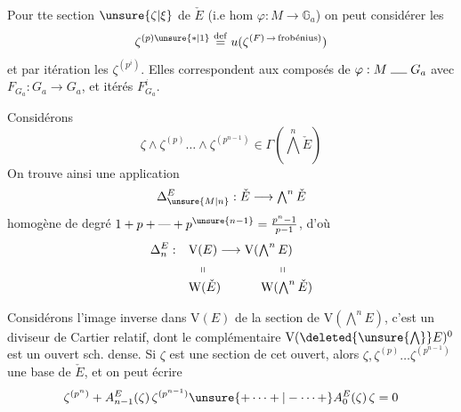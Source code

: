 Pour tte section $\unsure{\zeta|\xi}$ de $\check E$ (i.e hom $\varphi:M\to\mathbb G_a$) on peut considérer les 
\[
 \zeta^{(p)\unsure{*|1}}\overset{\mathrm{def}}{=}
 u(\zeta^{(F)\,\to\,\text{frobénius})})
\]
et par itération les $\zeta^{(p^i)}$. Elles correspondent aux composés de
$\varphi:M\mathrel{\rule{1.3em}{.4pt}}G_a$ avec $F_{G_a}:G_a\to G_a$,
et   itérés $F_{G_a}^{i}$.

Considérons
\[
 \zeta\wedge\zeta^{(p)}\ldots\wedge\zeta^{(p^{n-1})}
 \in\Gamma(\textstyle\bigwedge^n\check E)
\]
On trouve ainsi  une application 
\[
 \Delta^{E}_{\unsure{M|n}}:\check E\longrightarrow\textstyle\bigwedge^n\check E
\]
homogène de degré $1+p+\text{---}+p^{\unsure{n-1}}=\frac{p^n-1}{p-1}$, d'où
\[
 \begin{aligned}
 \Delta_{n}^E:\quad &\mathrm V(E)\longrightarrow \mathrm V(\textstyle\bigwedge^{n}E)\\
 &\hspace{.7em}\shortparallel \hspace{6em}\shortparallel\\[-2pt]
 &\mathrm W(\check E)\hspace{3.2em}\mathrm W(\textstyle\bigwedge^{n}\check E)
 \end{aligned}
\]

Considérons l'image inverse dans $\mathrm V(E)$ de la section  de
$\mathrm V(\bigwedge^{n}E)$, 
c'est un diviseur de Cartier relatif, dont le complémentaire
$\mathrm V(\deleted{\unsure{\bigwedge}}E)^0$ est un ouvert  sch. dense.
Si $\zeta$ est une section de cet ouvert, alors $\zeta,\zeta^{(p)}\ldots\zeta^{(p^{n-1})}$
 une base de $\check E$, et on peut écrire
\[
 \zeta^{(p^n)}+A^E_{n-1}(\zeta)\,\zeta^{(p^{n-1})}
 \unsure{+\cdots+|-\cdots+}A^E_0(\zeta)\,\zeta=0
\]
